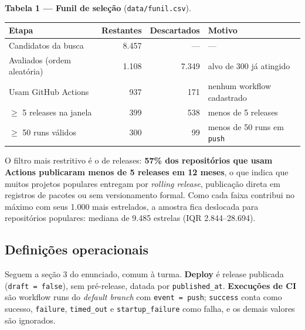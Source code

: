 \documentclass[12pt]{article}
\begin{document}
\textbf{Tabela 1 — Funil de seleção} (\texttt{data/funil.csv}).

\begin{table}[!htbp]
\centering
\scriptsize
\begin{tabular}{lrrl}
\toprule
\textbf{Etapa} & \textbf{Restantes} & \textbf{Descartados} & \textbf{Motivo} \\
\midrule
Candidatos da busca & 8.457 & — & — \\
Avaliados (ordem aleatória) & 1.108 & 7.349 & alvo de 300 já atingido \\
Usam GitHub Actions & 937 & 171 & nenhum workflow cadastrado \\
$\geq$ 5 releases na janela & 399 & 538 & menos de 5 releases \\
$\geq$ 50 runs válidos & 300 & 99 & menos de 50 runs em \texttt{push} \\
\bottomrule
\end{tabular}
\end{table}

O filtro mais restritivo é o de releases: \textbf{57\% dos repositórios que usam Actions publicaram menos de 5 releases em 12 meses}, o que indica que muitos projetos populares entregam por \emph{rolling release}, publicação direta em registros de pacotes ou sem versionamento formal. Como cada faixa contribui no máximo com seus 1.000 mais estrelados, a amostra fica deslocada para repositórios populares: mediana de 9.485 estrelas (IQR 2.844–28.694).

\subsection{Definições operacionais}

Seguem a seção 3 do enunciado, comum à turma. \textbf{Deploy} é release publicada (\texttt{draft = false}), sem pré-release, datada por \texttt{published\_at}. \textbf{Execuções de CI} são workflow runs do \emph{default branch} com \texttt{event = push}; \texttt{success} conta como sucesso, \texttt{failure}, \texttt{timed\_out} e \texttt{startup\_failure} como falha, e os demais valores são ignorados.
\end{document}
